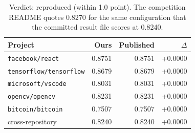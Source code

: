 \begin{table}[htbp]
\centering
\caption{Reproduction of the organisers' SetFit baseline.}
\label{tab:setfit}
\begin{tabular}{lrrr}
\toprule
Project & Ours & Published & $\Delta$ \\
\midrule
\texttt{facebook/react} & 0.8751 & 0.8751 & +0.0000 \\
\texttt{tensorflow/tensorflow} & 0.8679 & 0.8679 & +0.0000 \\
\texttt{microsoft/vscode} & 0.8031 & 0.8031 & +0.0000 \\
\texttt{opencv/opencv} & 0.8231 & 0.8231 & +0.0000 \\
\texttt{bitcoin/bitcoin} & 0.7507 & 0.7507 & +0.0000 \\
\midrule
cross-repository & 0.8240 & 0.8240 & +0.0000 \\
\bottomrule
\end{tabular}
\caption*{\footnotesize Verdict: reproduced (within 1.0 point). The competition README quotes 0.8270 for the same configuration that the committed result file scores at 0.8240.}
\end{table}
